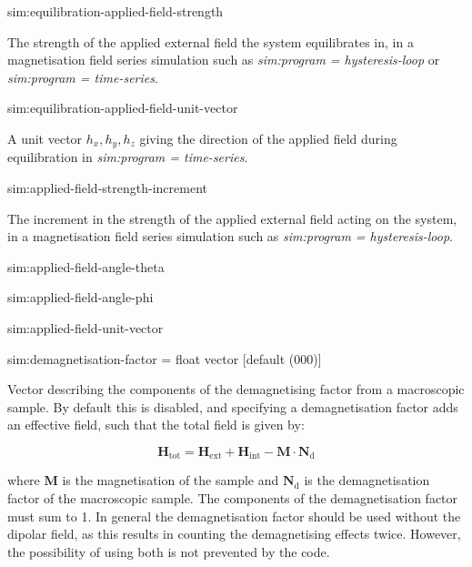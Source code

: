 {\zicf sim:equilibration-applied-field-strength}
   The strength of the applied external field the system equilibrates in, in a magnetisation field series simulation such as \textit{sim:program = hysteresis-loop} or \textit{sim:program = time-series}.

{\zicf sim:equilibration-applied-field-unit-vector}
A unit vector $h_x, h_y, h_z$ giving the direction of the applied field during equilibration in \textit{sim:program = time-series}.

{\zicf sim:applied-field-strength-increment}
   The increment in the strength of the applied external field acting on the system, in a magnetisation field series simulation such as \textit{sim:program = hysteresis-loop}.

{\zicf sim:applied-field-angle-theta}

{\zicf sim:applied-field-angle-phi}

{\zicf sim:applied-field-unit-vector}

{\zicf sim:demagnetisation-factor = float vector [default (000)]} Vector describing the components of the demagnetising factor from a macroscopic sample. By default this is disabled, and specifying a demagnetisation factor adds an effective field, such that the total field is given by:

\begin{equation*}
\mathbf{H}_{\mathrm{tot}} = \mathbf{H}_{\mathrm{ext}} + \mathbf{H}_{\mathrm{int}} - \mathbf{M} \cdot \mathbf{N}_{\mathrm{d}}
\end{equation*}

\noindent where $\mathbf{M}$ is the magnetisation of the sample and $\mathbf{N}_{\mathrm{d}}
$ is the demagnetisation factor of the macroscopic sample. The components of the demagnetisation factor must sum to 1. In general the demagnetisation factor should be used without the dipolar field, as this results in counting the demagnetising effects twice. However, the possibility of using both is not prevented by the code.

